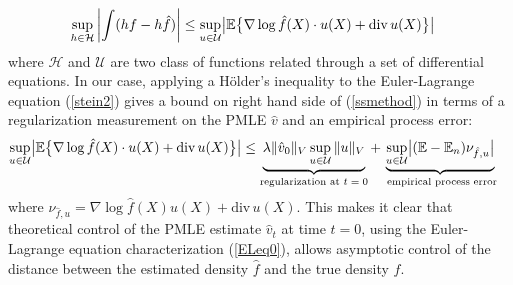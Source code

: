 \documentclass[noinfoline]{imsart}
\begin{document}
\begin{align} \sup_{h\in \mathcal H} \left| \int ( h f - h \hat f ) \right| &\leq \sup_{u\in \mathcal U} \bigl| \Bbb E\bigl\{ \nabla \log \hat f(X)\cdot u(X) + \text{div}\, u(X)\bigr\} \bigr| \label{ssmethod}
 \end{align}
where $\mathcal H$ and $\mathcal U$ are two class of functions related through a set of differential equations.
  In our case, applying a H\"older's inequality to the Euler-Lagrange equation (\ref{stein2}) gives a bound on  right hand side of (\ref{ssmethod}) in terms of a regularization measurement on the PMLE $\hat v$ and an empirical process error:
    \begin{align}
    \label{reg1}
     \sup_{u\in \mathcal U} \bigl| \Bbb E\bigl\{ \nabla \log \hat f(X) \cdot u(X) + \text{div}\, u(X)\bigr\} \bigr|   &\leq \underbrace{ \lambda \| \hat v_0\|_V   \sup_{u\in \mathcal U} \|  u \|_V}_\text{regularization at $t=0$} + \underbrace{\sup_{u\in \mathcal U} \bigl| (\Bbb E -\Bbb E_n) \nu_{\hat f,u}\bigr|}_\text{ empirical process error}
 \end{align}
 where $\nu_{\hat f,u} = \nabla \log \hat f(X) u(X) + \text{div}\, u(X)$.
 This makes it clear that  theoretical control of the PMLE estimate $\hat v_t$ at time $t=0$, using the Euler-Lagrange equation characterization (\ref{ELeq0}), allows asymptotic control of the distance between the estimated density $\hat f$ and the true density $f$.
\end{document}
